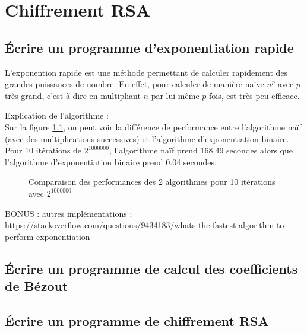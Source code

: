 \chapter{Chiffrement RSA}

\section{Écrire un programme d'exponentiation rapide}

L'exponention rapide est une méthode permettant de calculer rapidement des grandes puissances de nombre. En effet, pour calculer de manière naïve $n^p$ avec $p$ très grand, c'est-à-dire en multipliant $n$ par lui-même $p$ fois, est très peu efficace.

Explication de l'algorithme :\\

Sur la figure \ref{fig:perf_exp_rapide}, on peut voir la différence de performance entre l'algorithme naïf (avec des multiplications successives) et l'algorithme d'exponentiation
binaire. Pour 10 itérations de $2^{1000000}$, l'algorithme naïf prend 168.49 secondes alors que l'algorithme d'exponentiation binaire prend 0.04 secondes. \\

\begin{figure}[H]
\centering
\caption{Comparaison des performances des 2 algorithmes pour 10 itérations avec $2^{1000000}$} \label{fig:perf_exp_rapide}
\end{figure}


BONUS : autres implémentations : https://stackoverflow.com/questions/9434183/whats-the-fastest-algorithm-to-perform-exponentiation

\section{Écrire un programme de calcul des coefficients de Bézout}



\section{Écrire un programme de chiffrement RSA}